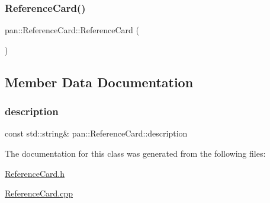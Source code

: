 \subsubsection{\texorpdfstring{Reference\+Card()}{ReferenceCard()}}
{\footnotesize\ttfamily pan\+::\+Reference\+Card\+::\+Reference\+Card (\begin{DoxyParamCaption}{ }\end{DoxyParamCaption})}



\subsection{Member Data Documentation}
\mbox{\label{classpan_1_1_reference_card_a770a4188e98004fab2b13218f29bde26}} 
\subsubsection{\texorpdfstring{description}{description}}
{\footnotesize\ttfamily const std\+::string\& pan\+::\+Reference\+Card\+::description}



The documentation for this class was generated from the following files\+:\begin{DoxyCompactItemize}
\item 
\hyperlink{_reference_card_8h}{Reference\+Card.\+h}\item 
\hyperlink{_reference_card_8cpp}{Reference\+Card.\+cpp}\end{DoxyCompactItemize}
